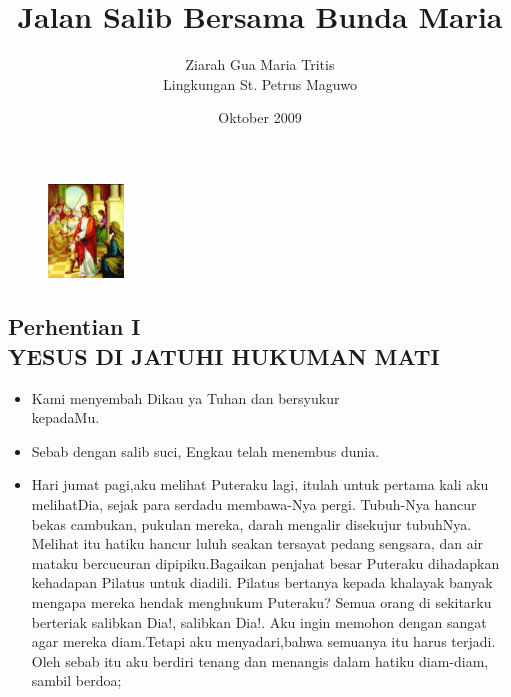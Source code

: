 \documentclass[a5paper,headsepline,titlepage,10pt,nnormalheadings,DIVcalc]{scrbook}
\title{Jalan Salib Bersama Bunda Maria}
\author{Ziarah Gua Maria Tritis\\Lingkungan St. Petrus Maguwo}
\date{Oktober 2009}
\newcommand{\BU}[1]{\begin{itemize} \item[U:] #1 \end{itemize}}
\newcommand{\BP}[1]{\begin{itemize} \item[P:] #1 \end{itemize}}
\begin{document}
\maketitle


\begin{figure}
\includegraphics[width=2cm]{jalansalib_files/01_small.jpg}
\end{figure}
\subsection*{Perhentian I \\
YESUS DI JATUHI HUKUMAN MATI}

\BP{ Kami menyembah Dikau ya Tuhan dan bersyukur\\kepadaMu.}
\BU{ Sebab dengan salib suci, Engkau telah menembus dunia.}

\BP{Hari jumat pagi,aku melihat Puteraku lagi, itulah untuk pertama kali aku melihatDia, sejak para serdadu membawa-Nya pergi. Tubuh-Nya hancur bekas cambukan, pukulan mereka, darah mengalir disekujur tubuhNya. Melihat itu hatiku hancur luluh seakan tersayat pedang sengsara, dan air mataku bercucuran dipipiku.Bagaikan penjahat besar Puteraku dihadapkan kehadapan Pilatus untuk diadili. Pilatus bertanya kepada khalayak banyak mengapa mereka hendak menghukum Puteraku? Semua orang di sekitarku berteriak salibkan Dia!, salibkan Dia!. Aku ingin memohon dengan sangat agar mereka diam.Tetapi aku menyadari,bahwa semuanya itu harus terjadi. Oleh sebab itu aku berdiri tenang dan menangis dalam hatiku diam-diam, sambil berdoa;}
\end{document}
